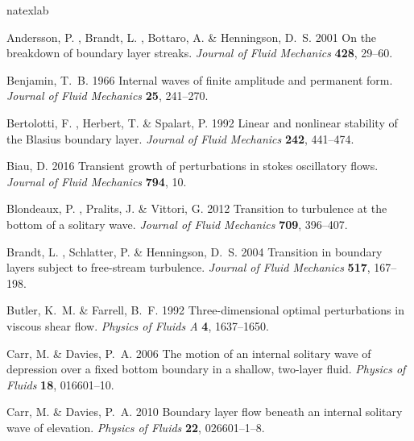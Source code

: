 \documentclass{jfm}
\begin{document}

%
\begin{thebibliography}{45}
\expandafter\ifx\csname natexlab\endcsname\relax\def\natexlab#1{#1}\fi

{\sc Andersson, P. , Brandt, L. , Bottaro, A.  \& Henningson, D.~S. } 2001 On
  the breakdown of boundary layer streaks. {\em Journal of Fluid Mechanics\/}
  {\bf 428}, 29--60.

{\sc Benjamin, T.~B. } 1966 Internal waves of finite amplitude and permanent
  form. {\em Journal of Fluid Mechanics\/} {\bf 25}, 241--270.

{\sc Bertolotti, F. , Herbert, T.  \& Spalart, P. } 1992 Linear and nonlinear
  stability of the {B}lasius boundary layer. {\em Journal of Fluid Mechanics\/}
  {\bf 242}, 441--474.

{\sc Biau, D. } 2016 Transient growth of perturbations in stokes oscillatory
  flows. {\em Journal of Fluid Mechanics\/} {\bf 794}, 10.

{\sc Blondeaux, P. , Pralits, J.  \& Vittori, G. } 2012 Transition to
  turbulence at the bottom of a solitary wave. {\em Journal of Fluid
  Mechanics\/} {\bf 709}, 396--407.

{\sc Brandt, L. , Schlatter, P.  \& Henningson, D.~S. } 2004 Transition in
  boundary layers subject to free-stream turbulence. {\em Journal of Fluid
  Mechanics\/} {\bf 517}, 167--198.

{\sc Butler, K.~M.  \& Farrell, B.~F. } 1992 Three-dimensional optimal
  perturbations in viscous shear flow. {\em Physics of Fluids A\/} {\bf 4},
  1637--1650.

{\sc Carr, M.  \& Davies, P.~A. } 2006 The motion of an internal solitary wave
  of depression over a fixed bottom boundary in a shallow, two-layer fluid.
  {\em Physics of Fluids\/} {\bf 18}, 016601--10.

{\sc Carr, M.  \& Davies, P.~A. } 2010 Boundary layer flow beneath an internal
  solitary wave of elevation. {\em Physics of Fluids\/} {\bf 22}, 026601--1--8.


\end{thebibliography}
\end{document}
